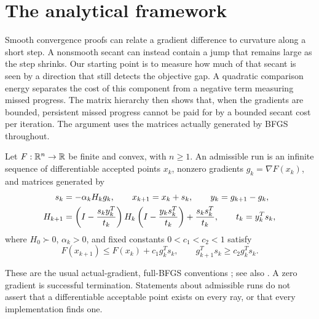 \section{The analytical framework}\label{art:energy}

Smooth convergence proofs can relate a gradient difference to curvature along
a short step. A nonsmooth secant can instead contain a jump that remains large
as the step shrinks. Our starting point is to measure how much of that secant
is seen by a direction that still detects the objective gap. A quadratic
comparison energy separates the cost of this component from a negative term
measuring missed progress. The matrix hierarchy then shows that, when the
gradients are bounded, persistent missed progress cannot be paid for by a
bounded secant cost per iteration.
The argument uses the matrices actually generated by BFGS throughout.

\begin{definition}\label{art:admissible}
Let $F:\mathbb R^n\to\mathbb R$ be finite and convex, with $n\ge1$.
An admissible run is an infinite sequence of differentiable accepted points
$x_k$, nonzero gradients $g_k=\nabla F(x_k)$, and matrices generated by
\begin{align}
 s_k&=-\alpha_kH_kg_k,\qquad x_{k+1}=x_k+s_k,
       \qquad y_k=g_{k+1}-g_k,\notag\\
 H_{k+1}&=\left(I-\frac{s_ky_k^T}{t_k}\right)
 H_k\left(I-\frac{y_ks_k^T}{t_k}\right)
       +\frac{s_ks_k^T}{t_k},\qquad t_k=y_k^Ts_k,\label{art:update}
\end{align}
where $H_0\succ0$, $\alpha_k>0$, and fixed constants $0<c_1<c_2<1$ satisfy
\begin{equation}\label{art:aw}
 F(x_{k+1})\le F(x_k)+c_1g_k^Ts_k,
 \qquad g_{k+1}^Ts_k\ge c_2g_k^Ts_k.
\end{equation}
\end{definition}
These are the usual actual-gradient, full-BFGS conventions
\cite{LO}; see also .
A zero gradient is successful termination. Statements about
admissible runs do not assert that a differentiable acceptable point exists on
every ray, or that every implementation finds one.

